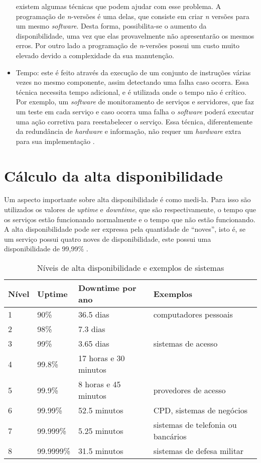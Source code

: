 \begin{itemize}
 existem algumas técnicas que podem ajudar com esse problema. A programação de \textit{n}-versões é uma delas, que consiste em criar 
 \textit{n} versões para um mesmo \textit{software}. Desta forma, possibilita-se o aumento da disponibilidade, uma vez que elas provavelmente 
 não apresentarão os mesmos erros. Por outro lado a programação de \textit{n}-versões possui um custo muito elevado devido a complexidade 
 da sua manutenção.
 \item Tempo: este é feito através da execução de um conjunto de instruções várias vezes no mesmo componente, assim detectando uma falha caso 
 ocorra. Essa técnica necessita tempo adicional, e é utilizada onde o tempo não é crítico. Por exemplo, um \textit{software} de monitoramento 
 de serviços e servidores, que faz um teste em cada serviço e caso ocorra uma falha o \textit{software} poderá executar uma ação corretiva para 
 reestabelecer o serviço. Essa técnica, diferentemente da redundância de \textit{hardware} e informação, não requer um \textit{hardware} 
 extra para sua implementação \cite{costa2009}.
\end{itemize}

\section{Cálculo da alta disponibilidade}

Um aspecto importante sobre alta disponibilidade é como medi-la. Para isso são utilizados os valores de \textit{uptime} e \textit{downtime}, 
que são respectivamente, o tempo que os serviços estão funcionando normalmente e o tempo que não estão funcionando. A alta disponibilidade 
pode ser expressa pela quantidade de ``noves'', isto é, se um serviço possui quatro noves de disponibilidade, este possui uma 
disponibilidade de 99,99\% \cite{pereirafilho2004}.

\begin{table}
\caption {Níveis de alta disponibilidade e exemplos de sistemas}
\label{tab:dispniveis}
\begin{center}
\begin{tabular}{|l|l|l|l|}\hline
Nível & Uptime & Downtime por ano & Exemplos\\\hline
1 & 90\% & 36.5 dias & computadores pessoais\\\hline
2 & 98\% & 7.3 dias & \\\hline
3 & 99\% & 3.65 dias & sistemas de acesso\\\hline
4 & 99.8\% & 17 horas e 30 minutos & \\\hline
5 & 99.9\% & 8 horas e 45 minutos & provedores de acesso\\\hline
6 & 99.99\% & 52.5 minutos & CPD, sistemas de negócios\\\hline
7 & 99.999\% & 5.25 minutos & sistemas de telefonia ou bancários\\\hline
8 & 99.9999\% & 31.5 minutos & sistemas de defesa militar\\\hline
\end{tabular}
\end{center}
\end{table}

